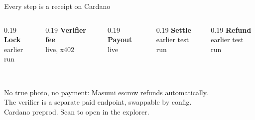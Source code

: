 \begin{frame}{Every step is a receipt on Cardano}
  \centering\scriptsize
  \begin{columns}[T]
    \begin{column}{0.19\textwidth}\centering
      {\bfseries Lock}\\{\color{cardano}earlier run}\\[0.3em]\qrcode[height=1.6cm]{\UrlLock}\\[0.2em]\TxLock
    \end{column}
    \begin{column}{0.19\textwidth}\centering
      {\bfseries Verifier fee}\\{\color{okgreen}live, x402}\\[0.3em]\qrcode[height=1.6cm]{\UrlFee}\\[0.2em]\TxFee
    \end{column}
    \begin{column}{0.19\textwidth}\centering
      {\bfseries Payout}\\{\color{okgreen}live}\\[0.3em]\qrcode[height=1.6cm]{\UrlPayout}\\[0.2em]\TxPayout
    \end{column}
    \begin{column}{0.19\textwidth}\centering
      {\bfseries Settle}\\{\color{cardano}earlier test run}\\[0.3em]\qrcode[height=1.6cm]{\UrlSettle}\\[0.2em]\TxSettle
    \end{column}
    \begin{column}{0.19\textwidth}\centering
      {\bfseries Refund}\\{\color{cardano}earlier test run}\\[0.3em]\qrcode[height=1.6cm]{\UrlRefund}\\[0.2em]\TxRefund
    \end{column}
  \end{columns}
  \vspace{1em}
  {\small No true photo, no payment: Masumi escrow refunds automatically.\\
  The verifier is a separate paid endpoint, swappable by config.}\\[0.4em]
  Cardano preprod. Scan to open in the explorer.
\end{frame}

